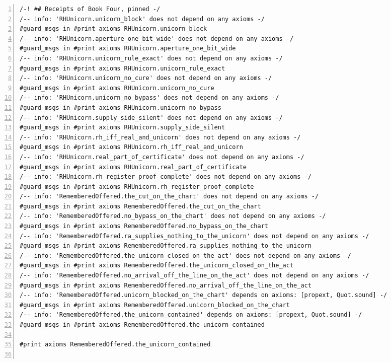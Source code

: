 \documentclass[10pt]{article}
\newcommand{\leansize}{\fontsize{5.5pt}{6.75pt}\selectfont}
\begin{document}
\begin{multicols}{2}
\begin{Verbatim}[numbers=left,firstnumber=1,numbersep=3pt,xleftmargin=2.6em,breaklines=true,breakanywhere=true,breakautoindent=false,breakindent=1.4em,breaksymbolleft={},breakanywheresymbolpre={},fontsize=\leansize]
/-! ## Receipts of Book Four, pinned -/
/-- info: 'RHUnicorn.unicorn_block' does not depend on any axioms -/
#guard_msgs in #print axioms RHUnicorn.unicorn_block
/-- info: 'RHUnicorn.aperture_one_bit_wide' does not depend on any axioms -/
#guard_msgs in #print axioms RHUnicorn.aperture_one_bit_wide
/-- info: 'RHUnicorn.unicorn_rule_exact' does not depend on any axioms -/
#guard_msgs in #print axioms RHUnicorn.unicorn_rule_exact
/-- info: 'RHUnicorn.unicorn_no_cure' does not depend on any axioms -/
#guard_msgs in #print axioms RHUnicorn.unicorn_no_cure
/-- info: 'RHUnicorn.unicorn_no_bypass' does not depend on any axioms -/
#guard_msgs in #print axioms RHUnicorn.unicorn_no_bypass
/-- info: 'RHUnicorn.supply_side_silent' does not depend on any axioms -/
#guard_msgs in #print axioms RHUnicorn.supply_side_silent
/-- info: 'RHUnicorn.rh_iff_real_and_unicorn' does not depend on any axioms -/
#guard_msgs in #print axioms RHUnicorn.rh_iff_real_and_unicorn
/-- info: 'RHUnicorn.real_part_of_certificate' does not depend on any axioms -/
#guard_msgs in #print axioms RHUnicorn.real_part_of_certificate
/-- info: 'RHUnicorn.rh_register_proof_complete' does not depend on any axioms -/
#guard_msgs in #print axioms RHUnicorn.rh_register_proof_complete
/-- info: 'RememberedOffered.the_cut_on_the_chart' does not depend on any axioms -/
#guard_msgs in #print axioms RememberedOffered.the_cut_on_the_chart
/-- info: 'RememberedOffered.no_bypass_on_the_chart' does not depend on any axioms -/
#guard_msgs in #print axioms RememberedOffered.no_bypass_on_the_chart
/-- info: 'RememberedOffered.ra_supplies_nothing_to_the_unicorn' does not depend on any axioms -/
#guard_msgs in #print axioms RememberedOffered.ra_supplies_nothing_to_the_unicorn
/-- info: 'RememberedOffered.the_unicorn_closed_on_the_act' does not depend on any axioms -/
#guard_msgs in #print axioms RememberedOffered.the_unicorn_closed_on_the_act
/-- info: 'RememberedOffered.no_arrival_off_the_line_on_the_act' does not depend on any axioms -/
#guard_msgs in #print axioms RememberedOffered.no_arrival_off_the_line_on_the_act
/-- info: 'RememberedOffered.unicorn_blocked_on_the_chart' depends on axioms: [propext, Quot.sound] -/
#guard_msgs in #print axioms RememberedOffered.unicorn_blocked_on_the_chart
/-- info: 'RememberedOffered.the_unicorn_contained' depends on axioms: [propext, Quot.sound] -/
#guard_msgs in #print axioms RememberedOffered.the_unicorn_contained

#print axioms RememberedOffered.the_unicorn_contained


\end{Verbatim}
\end{multicols}
\end{document}
